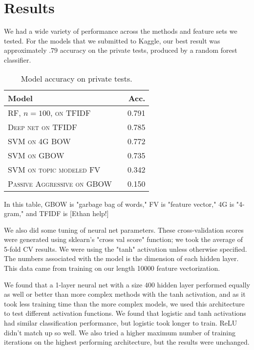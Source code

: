 \documentclass[11pt]{article}
\begin{document}
\section{Results}
We had a wide variety of performance across the methods and feature sets we tested. For the models that we submitted to Kaggle, our best result was approximately $.79$ accuracy on the private tests, produced by a random forest classifier.
 \\
\begin{table}[h]
\centering
\begin{tabular}{llr}
	\toprule
	Model &  & Acc. \\
	\midrule
	\textsc{RF, $n=100$, on TFIDF} & & 0.791\\
	\textsc{Deep net on TFIDF} & & 0.785\\
	\textsc{SVM on 4G BOW} & & 0.772 \\
	\textsc{SVM on GBOW} & & 0.735  \\
	\textsc{SVM on topic modeled FV} & & 0.342 \\
	\textsc{Passive Aggressive on GBOW} & & 0.150\\
	\bottomrule
\end{tabular}
\caption{Model accuracy on private tests.}
\end{table}

In this table, GBOW is "garbage bag of words," FV is "feature vector," 4G is "4-gram," and TFIDF is [Ethan help!]

We also did some tuning of neural net parameters. These cross-validation scores were generated using sklearn's "cross val score" function; we took the average of 5-fold CV results. We were using the "tanh" activation unless otherwise specified. The numbers associated with the model is the dimension of each hidden layer. This data came from training on our length 10000 feature vectorization.

We found that a 1-layer neural net with a size $400$ hidden layer performed equally as well or better than more complex methods with the tanh activation, and as it took less training time than the more complex models, we used this architecture to test different activation functions. We found that logistic and tanh activations had similar classification performance, but logistic took longer to train. ReLU didn't match up so well. We also tried a higher maximum number of training iterations on the highest performing architecture, but the results were unchanged.
\end{document}
